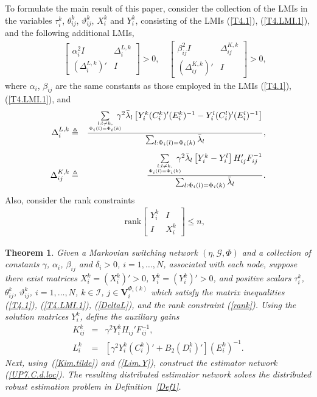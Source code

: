 \documentclass[a4paper,twocolumn]{autart}
\newtheorem{theorem}{Theorem}
\begin{document}
To formulate the main result of this paper, 
consider the collection of the LMIs in the variables
$\tau_i^k$, $\theta_{ij}^k$, $\vartheta_{ij}^k$, $X_i^k$ and $Y_i^k$,
consisting of the LMIs (\ref{T4.1}), (\ref{T4.LMI.1}), and the following
additional LMIs, 
\begin{eqnarray}
  \label{DeltaL}
&&  \left[
    \begin{array}{cc}
      \alpha_i^2 I & \Delta_i^{L,k} \\ (\Delta_i^{L,k})' & I
    \end{array}
\right]>0, \quad 
  \label{DeltaK}
  \left[
    \begin{array}{cc}
      \beta_{ij}^2 I & \Delta_{ij}^{K,k} \\ (\Delta_{ij}^{K,k})' & I
    \end{array}
\right]>0,
\end{eqnarray}
where $\alpha_i$, $\beta_{ij}$ are the same constants as those employed in
the LMIs (\ref{T4.1}), (\ref{T4.LMI.1}), and
\begin{eqnarray*}
\Delta_i^{L,k}&\triangleq &\frac{\sum\limits_{l:l\neq k,\atop \Phi_i(l)=\Phi_i(k)}\!\!\!\!\!
      \gamma^2\bar\lambda_l
      \left[Y_i^k(C_i^k)'(E_i^k)^{-1}-Y_i^l(C_i^l)'(E_i^l)^{-1}\right]}{\sum_{l:\Phi_i(l)=\Phi_i(k)}
      \bar\lambda_l } , \\[1ex]
\Delta_{ij}^{K,k}&\triangleq &\frac{\sum\limits_{l:l\neq k,
    \atop\Phi_i(l)=\Phi_i(k)}\!\!\!\!\!
\gamma^2\bar\lambda_l
      \left[Y_i^k-Y_i^l\right]H_{ij}'F_{ij}^{-1}}{\sum_{l:\Phi_i(l)=\Phi_i(k)}
      \bar\lambda_l } 
      .
\end{eqnarray*}
Also, consider the rank constraints
\begin{eqnarray}
&&\mathrm{rank}\left[\begin{array}{cc} Y_i^k & I \\ I & X_i^k
  \end{array}
\right] \le n, 
  \label{rank}
\end{eqnarray}

\begin{theorem}\label{T.main}
Given a Markovian switching network $(\eta,\mathcal{G},\Phi)$ and a
collection of 
constants $\gamma$, $\alpha_i$, $\beta_{ij}$ and $\delta_i>0$, $i=1,\ldots,
N$, associated with each node, suppose
there exist matrices $X_i^k=(X_i^k)'>0$,  
$Y_i^k=(Y_i^k)'>0$, and positive scalars  
  $\tau_i^k$, $\theta_{ij}^k$, $\vartheta_{ij}^k$, $i=1,\ldots,N$,
  $k\in\mathcal{I}$, $j\in\mathbf{V}_i^{\Phi_i(k)}$ which satisfy the
  matrix inequalities (\ref{T4.1}), (\ref{T4.LMI.1}), (\ref{DeltaL}),
  and the rank constraint (\ref{rank}).
  Using the solution matrices $Y_{i}^k$, define the auxiliary gains 
\begin{eqnarray}
 K_{ij}^k&=&\gamma^2Y_i^kH_{ij}'F_{ij}^{-1},  \label{Kim.Y} \nonumber
 \\
 L_i^k&=&\left[\gamma^2Y_i^k(C_i^k)'+
B_2 (D_i^k)'\right](E_i^k)^{-1}. \label{Lim.Y}
\end{eqnarray}
Next, using~(\ref{Kim.tilde}) and 
(\ref{Lim.Y}), 
  construct the estimator network (\ref{UP7.C.d.loc}). The resulting distributed
  estimatior network solves the distributed robust estimation problem in
  Definition~\ref{Def1}.  
\end{theorem}
\end{document}
